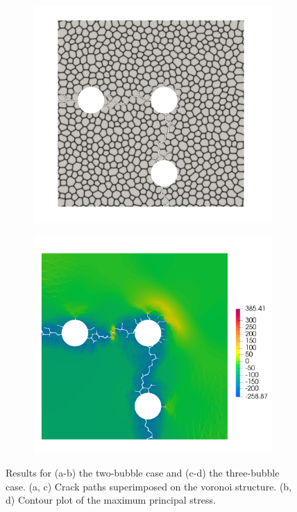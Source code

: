 \begin{figure}[htb!]
\begin{subfigure}[t]{0.4\linewidth}
    \caption{}
  \end{subfigure} \\
  \begin{subfigure}[t]{0.4\linewidth}
    \centering
    \includegraphics[width=\linewidth]{Chapter3/figures/three_bubbles_bnd}
    \caption{}
  \end{subfigure}
  \begin{subfigure}[t]{0.4\linewidth}
    \centering
    \includegraphics[width=\linewidth]{Chapter3/figures/three_bubbles_stress}
    \caption{}
  \end{subfigure}
  \caption[Crack propagation from multiple bubbles.]{Results for (a-b) the two-bubble case and (c-d) the three-bubble case. (a, c) Crack paths superimposed on the voronoi structure. (b, d) Contour plot of the maximum principal stress.}
  \label{fig:compare_bubble_distribution}
\end{figure}

